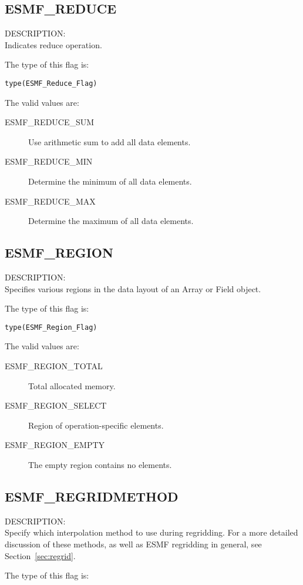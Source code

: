 \subsection{ESMF\_REDUCE}
\label{const:reduce}
{\sf DESCRIPTION:\\}
Indicates reduce operation.

The type of this flag is:

{\tt type(ESMF\_Reduce\_Flag)}

The valid values are:
\begin{description}
   \item [ESMF\_REDUCE\_SUM]
         Use arithmetic sum to add all data elements.
   \item [ESMF\_REDUCE\_MIN]
         Determine the minimum of all data elements.
   \item [ESMF\_REDUCE\_MAX]
         Determine the maximum of all data elements.
\end{description}

\subsection{ESMF\_REGION}
\label{const:region}
{\sf DESCRIPTION:\\}
Specifies various regions in the data layout of an Array or Field object.

The type of this flag is:

{\tt type(ESMF\_Region\_Flag)}

The valid values are:
\begin{description}
\item [ESMF\_REGION\_TOTAL]
      Total allocated memory.
\item [ESMF\_REGION\_SELECT]
      Region of operation-specific elements.
\item [ESMF\_REGION\_EMPTY]
      The empty region contains no elements.
\end{description}


\subsection{ESMF\_REGRIDMETHOD}
\label{opt:regridmethod}

{\sf DESCRIPTION:\\}  
Specify which interpolation method to use during regridding. For a more detailed discussion of these methods, as well as ESMF regridding in general, see Section~\ref{sec:regrid}.

The type of this flag is:

